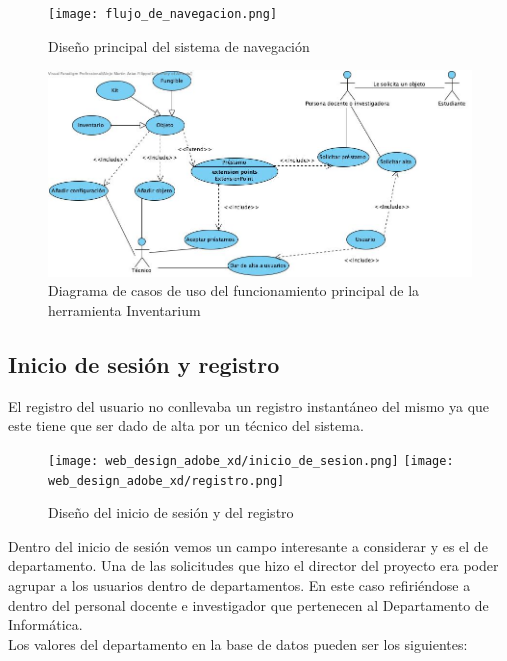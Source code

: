 \begin{figure}
    \texttt{[image: flujo\_de\_navegacion.png]}
    \caption{Diseño principal del sistema de navegación}\label{diseno_principal_sistema_navegacion}
\end{figure}

\begin{figure}
    \includegraphics[width=\textwidth,height=\textheight,keepaspectratio]{../../diagramas/visual_paradigm/funcionamiento_principal.jpg}
    \caption{Diagrama de casos de uso del funcionamiento principal de la herramienta Inventarium}\label{funcionamiento_principal_casos_de_uso}
\end{figure}


\subsection{Inicio de sesión y registro}

El registro del usuario no conllevaba un registro instantáneo del mismo ya que este tiene que ser dado de alta por un técnico del sistema.

\begin{figure}[H]
    \begin{center}
        \texttt{[image: web\_design\_adobe\_xd/inicio\_de\_sesion.png]}
        \texttt{[image: web\_design\_adobe\_xd/registro.png]}
        \caption{Diseño del inicio de sesión y del registro}
    \end{center}
\end{figure}

Dentro del inicio de sesión vemos un campo interesante a considerar y es el de departamento. Una de las solicitudes que hizo el director del proyecto era poder agrupar a los usuarios dentro de departamentos. En este caso refiriéndose a dentro del personal docente e investigador que pertenecen al Departamento de Informática.
\\Los valores del departamento en la base de datos pueden ser los siguientes:


